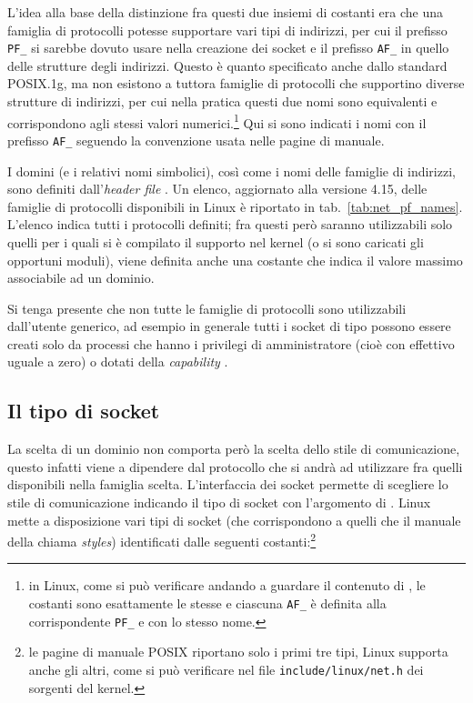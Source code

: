 L'idea alla base della distinzione fra questi due insiemi di costanti era che
una famiglia di protocolli potesse supportare vari tipi di indirizzi, per cui
il prefisso \texttt{PF\_} si sarebbe dovuto usare nella creazione dei socket e
il prefisso \texttt{AF\_} in quello delle strutture degli indirizzi. Questo è
quanto specificato anche dallo standard POSIX.1g, ma non esistono a tuttora
famiglie di protocolli che supportino diverse strutture di indirizzi, per cui
nella pratica questi due nomi sono equivalenti e corrispondono agli stessi
valori numerici.\footnote{in Linux, come si può verificare andando a guardare
  il contenuto di , le costanti sono esattamente le stesse
  e ciascuna \texttt{AF\_} è definita alla corrispondente \texttt{PF\_} e con
  lo stesso nome.} Qui si sono indicati i nomi con il prefisso \texttt{AF\_}
seguendo la convenzione usata nelle pagine di manuale.

I domini (e i relativi nomi simbolici), così come i nomi delle famiglie di
indirizzi, sono definiti dall'\textit{header file} . Un
elenco, aggiornato alla versione 4.15, delle famiglie di protocolli
disponibili in Linux è riportato in tab.~\ref{tab:net_pf_names}.  L'elenco
indica tutti i protocolli definiti; fra questi però saranno utilizzabili solo
quelli per i quali si è compilato il supporto nel kernel (o si sono caricati
gli opportuni moduli), viene definita anche una costante  che
indica il valore massimo associabile ad un dominio.

Si tenga presente che non tutte le famiglie di protocolli sono utilizzabili
dall'utente generico, ad esempio in generale tutti i socket di tipo
 possono essere creati solo da processi che hanno i privilegi
di amministratore (cioè con  effettivo uguale a zero) o dotati della
\textit{capability} .


\subsection{Il tipo di socket}
\label{sec:sock_type}

La scelta di un dominio non comporta però la scelta dello stile di
comunicazione, questo infatti viene a dipendere dal protocollo che si andrà ad
utilizzare fra quelli disponibili nella famiglia scelta. L'interfaccia dei
socket permette di scegliere lo stile di comunicazione indicando il tipo di
socket con l'argomento  di . Linux mette a
disposizione vari tipi di socket (che corrispondono a quelli che il manuale
della  \cite{GlibcMan} chiama \textit{styles}) identificati dalle
seguenti costanti:\footnote{le pagine di manuale POSIX riportano solo i primi
  tre tipi, Linux supporta anche gli altri, come si può verificare nel file
  \texttt{include/linux/net.h} dei sorgenti del kernel.}

